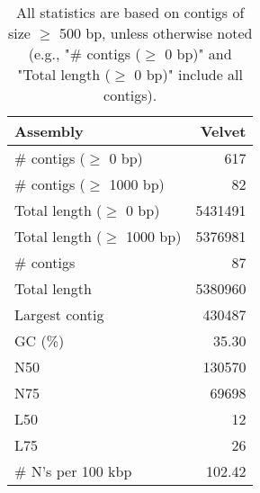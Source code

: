 \documentclass[12pt,a4paper]{article}
\begin{document}
\begin{table}[ht]
\begin{center}
\caption{All statistics are based on contigs of size $\geq$ 500 bp, unless otherwise noted (e.g., "\# contigs ($\geq$ 0 bp)" and "Total length ($\geq$ 0 bp)" include all contigs).}
\begin{tabular}{|l*{1}{|r}|}
\hline
Assembly & Velvet \\ \hline
\# contigs ($\geq$ 0 bp) & 617 \\ \hline
\# contigs ($\geq$ 1000 bp) & 82 \\ \hline
Total length ($\geq$ 0 bp) & 5431491 \\ \hline
Total length ($\geq$ 1000 bp) & 5376981 \\ \hline
\# contigs & 87 \\ \hline
Total length & 5380960 \\ \hline
Largest contig & 430487 \\ \hline
GC (\%) & 35.30 \\ \hline
N50 & 130570 \\ \hline
N75 & 69698 \\ \hline
L50 & 12 \\ \hline
L75 & 26 \\ \hline
\# N's per 100 kbp & 102.42 \\ \hline
\end{tabular}
\end{center}
\end{table}
\end{document}
